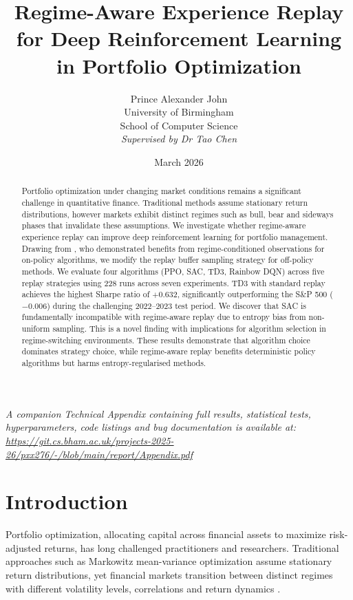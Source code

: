 \documentclass[11pt,a4paper]{article}
\title{Regime-Aware Experience Replay for Deep Reinforcement Learning in Portfolio Optimization}
\author{Prince Alexander John \\ University of Birmingham \\ School of Computer Science \\ \textit{Supervised by Dr Tao Chen}}
\date{March 2026}
\begin{document}
\maketitle

\begin{abstract}
Portfolio optimization under changing market conditions remains a significant challenge in quantitative finance. Traditional methods assume stationary return distributions, however markets exhibit distinct regimes such as bull, bear and sideways phases that invalidate these assumptions. We investigate whether regime-aware experience replay can improve deep reinforcement learning for portfolio management. Drawing from \citet{nixon2025regime}, who demonstrated benefits from regime-conditioned observations for on-policy algorithms, we modify the replay buffer sampling strategy for off-policy methods. We evaluate four algorithms (PPO, SAC, TD3, Rainbow DQN) across five replay strategies using 228 runs across seven experiments. TD3 with standard replay achieves the highest Sharpe ratio of $+0.632$, significantly outperforming the S\&P 500 ($-0.006$) during the challenging 2022--2023 test period. We discover that SAC is fundamentally incompatible with regime-aware replay due to entropy bias from non-uniform sampling. This is a novel finding with implications for algorithm selection in regime-switching environments. These results demonstrate that algorithm choice dominates strategy choice, while regime-aware replay benefits deterministic policy algorithms but harms entropy-regularised methods.
\end{abstract}

\vspace{0.5em}
\noindent\textit{A companion Technical Appendix containing full results, statistical tests, hyperparameters, code listings and bug documentation is available at: \url{https://git.cs.bham.ac.uk/projects-2025-26/pxx276/-/blob/main/report/Appendix.pdf}}

\section{Introduction}

Portfolio optimization, allocating capital across financial assets to maximize risk-adjusted returns, has long challenged practitioners and researchers. Traditional approaches such as Markowitz mean-variance optimization \citep{markowitz1952} assume stationary return distributions, yet financial markets transition between distinct regimes with different volatility levels, correlations and return dynamics \citep{hamilton1989regime, ang2002regime}.
\end{document}
